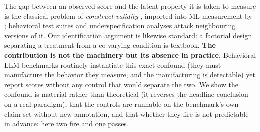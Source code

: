 The gap between an observed score and the latent property it is taken to measure is the classical problem of \emph{construct validity} \citep{cronbach1955construct}, imported into ML measurement by \citet{jacobs2021measurement}; behavioral test suites \citep{ribeiro2020beyond} and underspecification analyses \citep{damour2020underspecification} attack neighbouring versions of it. Our identification argument is likewise standard: a factorial design separating a treatment from a co-varying condition is textbook. \textbf{The contribution is not the machinery but its absence in practice.} Behavioral LLM benchmarks routinely instantiate this exact confound (they must manufacture the behavior they measure, and the manufacturing is detectable) yet report scores without any control that would separate the two. We show the confound is material rather than theoretical (it reverses the headline conclusion on a real paradigm), that the controls are runnable on the benchmark's own claim set without new annotation, and that whether they fire is not predictable in advance: here two fire and one passes.

